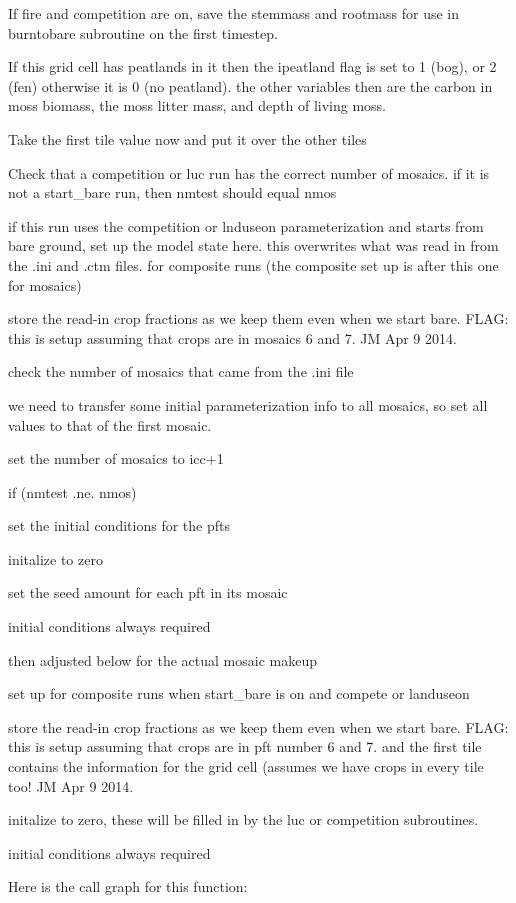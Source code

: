 If fire and competition are on, save the stemmass and rootmass for use in burntobare subroutine on the first timestep.

If this grid cell has peatlands in it then the ipeatland flag is set to 1 (bog), or 2 (fen) otherwise it is 0 (no peatland). the other variables then are the carbon in moss biomass, the moss litter mass, and depth of living moss.

Take the first tile value now and put it over the other tiles

Check that a competition or luc run has the correct number of mosaics. if it is not a start\+\_\+bare run, then nmtest should equal nmos

if this run uses the competition or lnduseon parameterization and starts from bare ground, set up the model state here. this overwrites what was read in from the .ini and .ctm files. for composite runs (the composite set up is after this one for mosaics)

store the read-\/in crop fractions as we keep them even when we start bare. F\+L\+A\+G\+: this is setup assuming that crops are in mosaics 6 and 7. J\+M Apr 9 2014.

check the number of mosaics that came from the .ini file

we need to transfer some initial parameterization info to all mosaics, so set all values to that of the first mosaic.

set the number of mosaics to icc+1

if (nmtest .ne. nmos)

set the initial conditions for the pfts

initalize to zero

set the seed amount for each pft in its mosaic

initial conditions always required

then adjusted below for the actual mosaic makeup

set up for composite runs when start\+\_\+bare is on and compete or landuseon

store the read-\/in crop fractions as we keep them even when we start bare. F\+L\+A\+G\+: this is setup assuming that crops are in pft number 6 and 7. and the first tile contains the information for the grid cell (assumes we have crops in every tile too! J\+M Apr 9 2014.

initalize to zero, these will be filled in by the luc or competition subroutines.

initial conditions always required 

Here is the call graph for this function\+:


